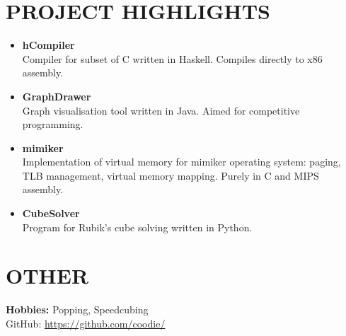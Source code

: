 \documentclass[line,overlapped]{res}
\begin{document}
\begin{resume}
\section{PROJECT HIGHLIGHTS}
\begin{itemize}
\item
{
	\textbf{hCompiler} \\
	Compiler for subset of C written in Haskell. Compiles directly to x86 assembly.
}
\item
{
	\textbf{GraphDrawer} \\
	Graph visualisation tool written in Java. Aimed for competitive programming.
}
\item
{
	\textbf{mimiker} \\
	Implementation of virtual memory for mimiker operating system: paging, TLB management, virtual memory mapping. Purely in C and MIPS assembly.
}
\item
{
	\textbf{CubeSolver} \\
	Program for Rubik's cube solving written in Python. 
}
\end{itemize}

\section{OTHER}
\textbf{Hobbies:} Popping, Speedcubing \\
GitHub: \url{https://github.com/coodie/}\\
\vfill

\end{resume}
\end{document}
